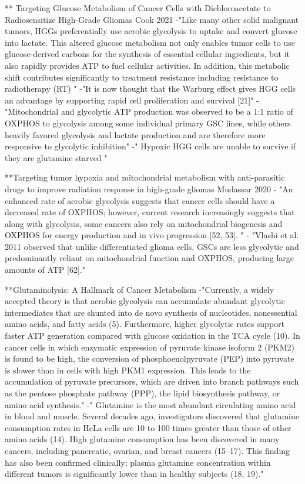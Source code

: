 \documentclass[11pt,a4paper]{article}
\begin{document}
** Targeting Glucose Metabolism of Cancer Cells with Dichloroacetate to Radiosensitize High-Grade Gliomas Cook 2021
-"Like many other solid malignant tumors, HGGs preferentially use aerobic glycolysis to uptake and convert glucose into lactate. This altered glucose metabolism not only enables tumor cells to use glucose-derived carbons for the synthesis of essential cellular ingredients, but it also rapidly provides ATP to fuel cellular activities. In addition, this metabolic shift contributes significantly to treatment resistance including resistance to radiotherapy (RT) "
-"It is now thought that the Warburg effect gives HGG cells an advantage by supporting rapid cell proliferation and survival [21]"
-"Mitochondrial and glycolytic ATP production was observed to be a 1:1 ratio of OXPHOS to glycolysis among some individual primary GSC lines, while others heavily favored glycolysis and lactate production and are therefore more responsive to glycolytic inhibition"
-" Hypoxic HGG cells are unable to survive if they are glutamine starved "

**Targeting tumor hypoxia and mitochondrial metabolism with anti-parasitic drugs to improve radiation response in high-grade gliomas Mudassar 2020
- "An enhanced rate of aerobic glycolysis suggests that cancer cells should have a decreased rate of OXPHOS; however, current research increasingly suggests that along with glycolysis, some cancers also rely on mitochondrial biogenesis and OXPHOS for energy production and in vivo progression [52, 53]. "
- "Vlashi et al. 2011 observed that unlike differentiated glioma cells, GSCs are less glycolytic and predominantly reliant on mitochondrial function and OXPHOS, producing large amounts of ATP [62]."


**Glutaminolysis: A Hallmark of Cancer Metabolism
-"Currently, a widely accepted theory is that aerobic glycolysis can accumulate abundant glycolytic intermediates that are shunted into de novo synthesis of nucleotides, nonessential amino acids, and fatty acids (5). Furthermore, higher glycolytic rates support faster ATP generation compared with glucose oxidation in the TCA cycle (10). In cancer cells in which enzymatic expression of pyruvate kinase isoform 2 (PKM2) is found to be high, the conversion of phosphoenolpyruvate (PEP) into pyruvate is slower than in cells with high PKM1 expression. This leads to the accumulation of pyruvate precursors, which are driven into branch pathways such as the pentose phosphate pathway (PPP), the lipid biosynthesis pathway, or amino acid synthesis."
-" Glutamine is the most abundant circulating amino acid in blood and muscle. Several decades ago, investigators discovered that glutamine consumption rates in HeLa cells are 10 to 100 times greater than those of other amino acids (14). High glutamine consumption has been discovered in many cancers, including pancreatic, ovarian, and breast cancers (15–17). This finding has also been confirmed clinically; plasma glutamine concentration within different tumors is significantly lower than in healthy subjects (18, 19)."
\end{document}
